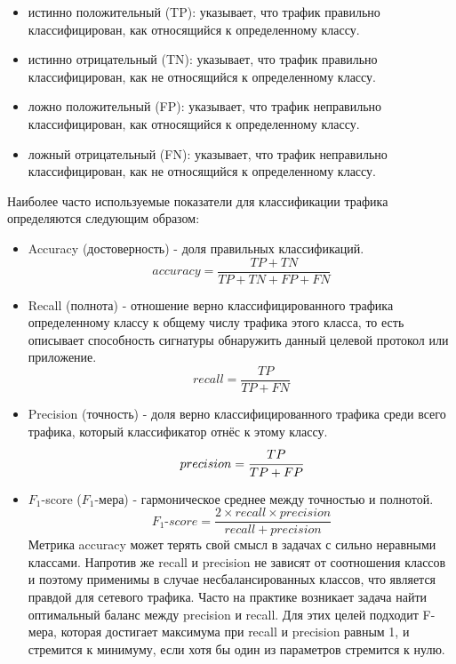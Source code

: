 \begin{itemize}
    \item истинно положительный (TP): указывает, что трафик правильно классифицирован, как относящийся к определенному классу.
    \item истинно отрицательный (TN): указывает, что трафик правильно классифицирован, как не относящийся к определенному классу.
    \item ложно положительный (FP): указывает, что трафик неправильно классифицирован, как относящийся к определенному классу.
    \item ложный отрицательный (FN): указывает, что трафик неправильно классифицирован, как не относящийся к определенному классу.
\end{itemize}

Наиболее часто используемые показатели для классификации трафика определяются следующим образом:

\begin{itemize}
    \item Accuracy (достоверность) - доля правильных классификаций.
    $$ accuracy = \dfrac{TP + TN}{TP + TN + FP + FN} $$

    \item Recall (полнота) - отношение верно классифицированного трафика определенному классу к общему числу трафика этого класса,
    то есть описывает способность сигнатуры обнаружить данный целевой протокол или приложение.
    $$ recall = \dfrac{TP}{TP + FN} $$

    \item Precision (точность) - доля верно классифицированного трафика среди всего трафика, который классификатор отнёс к этому классу.
    $$ precision = \cfrac{TP}{TP + FP} $$

    \item $F_1$-score ($F_1$-мера) - гармоническое среднее между точностью и полнотой.
     $$ \textit{$F_1$-score} = \dfrac{2 \times recall \times precision}{recall + precision} $$
    Метрика accuracy может терять свой смысл в задачах с сильно неравными классами.
    Напротив же recall и precision не зависят от соотношения классов и поэтому применимы в случае несбалансированных классов,
    что является правдой для сетевого трафика. Часто на практике возникает задача найти оптимальный баланс между precision
    и recall. Для этих целей подходит F-мера, которая достигает максимума при recall
    и precision равным 1, и стремится к минимуму, если хотя бы один из параметров стремится к нулю.


\end{itemize}

